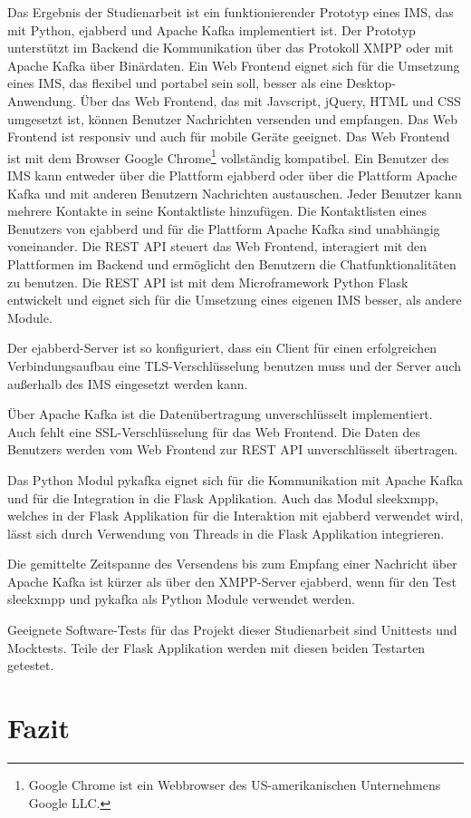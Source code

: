 \documentclass[a4paper,titlepage,halfparskip,12pt]{scrreprt}
\begin{document}
\begin{onehalfspacing}
Das Ergebnis der Studienarbeit ist ein funktionierender Prototyp eines \acs{IMS}, das mit Python, ejabberd und Apache Kafka implementiert ist. Der Prototyp unterstützt im Backend die Kommunikation über das Protokoll \acs{XMPP} oder mit Apache Kafka über Binärdaten. Ein Web Frontend eignet sich für die Umsetzung eines \acs{IMS}, das flexibel und portabel sein soll, besser als eine Desktop-Anwendung. Über das Web Frontend, das mit Javscript, jQuery, \acs{HTML} und \acs{CSS} umgesetzt ist, können Benutzer Nachrichten versenden und empfangen. Das Web Frontend ist responsiv und auch für mobile Geräte geeignet. Das Web Frontend ist mit dem Browser Google Chrome\footnote{Google Chrome ist ein Webbrowser des US-amerikanischen Unternehmens Google LLC.} vollständig kompatibel. Ein Benutzer des \acs{IMS} kann entweder über die Plattform ejabberd oder über die Plattform Apache Kafka und mit anderen Benutzern Nachrichten austauschen. Jeder Benutzer kann mehrere Kontakte in seine Kontaktliste hinzufügen. Die Kontaktlisten eines Benutzers von ejabberd und für die Plattform Apache Kafka sind unabhängig voneinander. Die \acs{REST} \acs{API} steuert das Web Frontend, interagiert mit den Plattformen im Backend und ermöglicht den Benutzern die Chatfunktionalitäten zu benutzen. Die \acs{REST} \acs{API} ist mit dem Microframework Python Flask entwickelt und eignet sich für die Umsetzung eines eigenen \acs{IMS} besser, als andere Module.

Der ejabberd-Server ist so konfiguriert, dass ein Client für einen erfolgreichen Verbindungsaufbau eine \acs{TLS}-Verschlüsselung benutzen muss und der Server auch außerhalb des \acs{IMS} eingesetzt werden kann.

Über Apache Kafka ist die Datenübertragung unverschlüsselt implementiert. Auch fehlt eine \acs{SSL}-Verschlüsselung für das Web Frontend. Die Daten des Benutzers werden vom Web Frontend zur \acs{REST} \acs{API} unverschlüsselt übertragen.

Das Python Modul pykafka eignet sich für die Kommunikation mit Apache Kafka und für die Integration in die Flask Applikation. Auch das Modul sleekxmpp, welches in der Flask Applikation für die Interaktion mit ejabberd verwendet wird, lässt sich durch Verwendung von Threads in die Flask Applikation integrieren.

Die gemittelte Zeitspanne des Versendens bis zum Empfang einer Nachricht über Apache Kafka ist kürzer als über den \acs{XMPP}-Server ejabberd, wenn für den Test sleekxmpp und pykafka als Python Module verwendet werden.

Geeignete Software-Tests für das Projekt dieser Studienarbeit sind Unittests und Mocktests. Teile der Flask Applikation werden mit diesen beiden Testarten getestet.

\pagebreak

\chapter{Fazit}
\label{chap:Fazit}


\end{onehalfspacing}
\newpage
\end{document}
